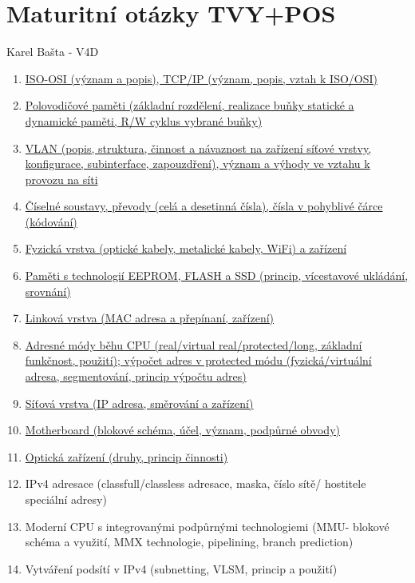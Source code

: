 \documentclass[a4paper,11pt]{article}
\begin{document}

\section*{Maturitní otázky TVY+POS}
\begin{center}
  \Large Karel Bašta - V4D
\end{center}
\begin{enumerate}
  \item \hyperref[sec:isoosi]{ISO-OSI (význam a popis), TCP/IP (význam, popis, vztah k ISO/OSI)}
  \item \hyperref[sec:polpameti]{Polovodičové paměti (základní rozdělení, realizace buňky statické a dynamické paměti, R/W cyklus vybrané buňky)}
  \item \hyperref[sec:vlan]{VLAN (popis, struktura, činnost a návaznost na zařízení síťové vrstvy, konfigurace, subinterface, zapouzdření), význam a výhody ve vztahu k provozu na síti}
  \item \hyperref[sec:ciselnesoustavy]{Číselné soustavy, převody (celá a desetinná čísla), čísla v pohyblivé čárce (kódování)}
  \item \hyperref[sec:fyzicka-vrstva]{Fyzická vrstva (optické kabely, metalické kabely, WiFi) a zařízení}
  \item \hyperref[sec:eeprom-flash-ssd]{Paměti s technologií EEPROM, FLASH a SSD (princip, vícestavové ukládání, srovnání)}
  \item \hyperref[sec:linkova-vrstva]{Linková vrstva (MAC adresa a přepínaní, zařízení)}
  \item \hyperref[sec:adresnemody]{Adresné módy běhu CPU (real/virtual real/protected/long, základní funkčnost, použití); výpočet adres v protected módu (fyzická/virtuální adresa, segmentování, princip výpočtu adres)}
  \item \hyperref[sec:sitova-vrstva]{Síťová vrstva (IP adresa, směrování a zařízení)}
  \item \hyperref[sec:motherboard]{Motherboard (blokové schéma, účel, význam, podpůrné obvody)}
  \item \hyperref[sec:opticka-zarizeni]{Optická zařízení (druhy, princip činnosti)}
  \item IPv4 adresace (classfull/classless adresace, maska, číslo sítě/ hostitele speciální adresy)
  \item Moderní CPU s integrovanými podpůrnými technologiemi (MMU- blokové schéma a využití, MMX technologie, pipelining, branch prediction)
  \item Vytváření podsítí v IPv4 (subnetting, VLSM, princip a použití)

\end{enumerate}
\end{document}
